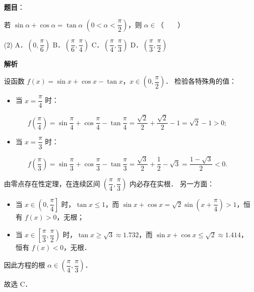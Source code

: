 \begin{answer}

\textbf{题目}：

若 $\sin\alpha + \cos\alpha = \tan\alpha$ $\left(0 < \alpha < \dfrac{\pi}{2}\right)$，则 $\alpha \in$\mbox{（　　）}

\begin{gkopts}(2)
\task A．$\left(0, \dfrac{\pi}{6}\right)$
\task B．$\left(\dfrac{\pi}{6}, \dfrac{\pi}{4}\right)$
\task C．$\left(\dfrac{\pi}{4}, \dfrac{\pi}{3}\right)$
\task D．$\left(\dfrac{\pi}{3}, \dfrac{\pi}{2}\right)$
\end{gkopts}

\textbf{解析}

设函数 $f(x) = \sin x + \cos x - \tan x$，$x \in \left(0, \dfrac{\pi}{2}\right)$．
检验各特殊角的值：
\begin{itemize}
\item 当 $x = \dfrac{\pi}{4}$ 时：
\end{itemize}
\nopagebreak[4]
\[
f\left(\frac{\pi}{4}\right) = \sin\frac{\pi}{4} + \cos\frac{\pi}{4} - \tan\frac{\pi}{4} = \frac{\sqrt{2}}{2} + \frac{\sqrt{2}}{2} - 1 = \sqrt{2} - 1 > 0;
\]
\begin{itemize}
\item 当 $x = \dfrac{\pi}{3}$ 时：
\end{itemize}
\nopagebreak[4]
\[
f\left(\frac{\pi}{3}\right) = \sin\frac{\pi}{3} + \cos\frac{\pi}{3} - \tan\frac{\pi}{3} = \frac{\sqrt{3}}{2} + \frac{1}{2} - \sqrt{3} = \frac{1 - \sqrt{3}}{2} < 0.
\]

由零点存在性定理，在连续区间 $\left(\dfrac{\pi}{4}, \dfrac{\pi}{3}\right)$ 内必存在实根．
另一方面：
\begin{itemize}
\item 当 $x \in \left(0, \dfrac{\pi}{4}\right]$ 时，$\tan x \leqslant 1$，而 $\sin x + \cos x = \sqrt{2}\sin\left(x + \dfrac{\pi}{4}\right) > 1$，恒有 $f(x) > 0$，无根；
\item 当 $x \in \left[\dfrac{\pi}{3}, \dfrac{\pi}{2}\right)$ 时，$\tan x \geqslant \sqrt{3} \approx 1.732$，而 $\sin x + \cos x \leqslant \sqrt{2} \approx 1.414$，恒有 $f(x) < 0$，无根．
\end{itemize}

因此方程的根 $\alpha \in \left(\dfrac{\pi}{4}, \dfrac{\pi}{3}\right)$．

故选 C．


\end{answer}
